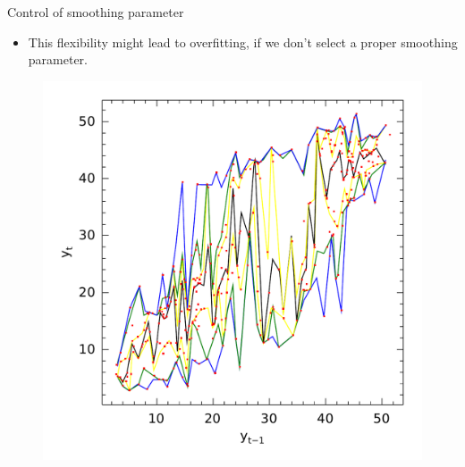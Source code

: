 \begin{frame}{Control of smoothing parameter}

\begin{itemize}
\tightlist
\item
  This flexibility might lead to overfitting, if we don't select a
  proper smoothing parameter.
\end{itemize}

\begin{figure}
  \centering
  \begin{minipage}[t]{\linewidth}
    \centering
    \begin{minipage}[t]{0.45\linewidth}
      \centering     \includegraphics[width=\textwidth]{../Figuras/npqar/icaraizinho-crossing-01}
    \end{minipage}
    \begin{minipage}[t]{0.45\linewidth}

\end{minipage}
\end{minipage}
\end{figure}
\end{frame}

